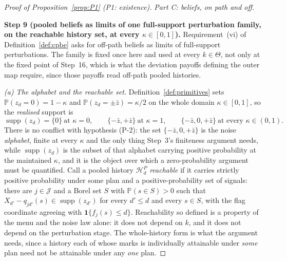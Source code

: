 \documentclass[11pt]{article}
\newcommand{\Prb}{\mathbb{P}}
\newcommand{\ind}{\mathbf{1}}
\begin{document}
\begin{proof}[Proof of Proposition~\ref{prop:P1} (P1: existence)]
\medskip
\noindent\emph{Part C: beliefs, on path and off.}

\smallskip
\noindent\textbf{Step 9 (pooled beliefs as limits of one full-support perturbation family, on the
reachable history set, at every $\kappa \in [0,1]$).}
Requirement~(vi) of Definition~\ref{def:cpbe} asks for off-path beliefs as limits of full-support
perturbations. The family is fixed once here and used at every $k \in \Theta$, not only at the fixed
point of Step~16, which is what the deviation payoffs defining the outer map require, since those
payoffs read off-path pooled histories.

\emph{(a) The alphabet and the reachable set.} Definition~\ref{def:primitives} sets
$\Prb(z_d = 0) = 1-\kappa$ and $\Prb(z_d = \pm\bar z) = \kappa/2$ on the whole domain
$\kappa \in [0,1]$, so the \emph{realised} support is
\[
\operatorname{supp}(z_d) = \{0\} \ \text{at } \kappa = 0,
\qquad
\{-\bar z,+\bar z\} \ \text{at } \kappa = 1,
\qquad
\{-\bar z,0,+\bar z\} \ \text{at every } \kappa \in (0,1).
\]
There is no conflict with hypothesis (P-2): the set $\{-\bar z,0,+\bar z\}$ is the noise
\emph{alphabet}, finite at every $\kappa$ and the only thing Step~3's finiteness argument needs,
while $\operatorname{supp}(z_d)$ is the subset of that alphabet carrying positive probability at the
maintained $\kappa$, and it is the object over which a zero-probability argument must be quantified.
Call a pooled history $\mathcal H_d^P$ \emph{reachable} if it carries strictly positive probability
under some plan and a positive-probability set of signals: there are $j \in \mathcal J$ and a Borel
set $S$ with $\Prb(s \in S) > 0$ such that $X_{d'}-q_{jd'}(s) \in \operatorname{supp}(z_{d'})$ for
every $d' \le d$ and every $s \in S$, with the flag coordinate agreeing with $\ind\{f_j(s) \le d\}$.
Reachability so defined is a property of the menu and the noise law alone: it does not depend on $k$,
and it does not depend on the perturbation stage. The whole-history form is what the argument needs,
since a history each of whose marks is individually attainable under \emph{some} plan need not be
attainable under any \emph{one} plan.


\end{proof}
\end{document}
